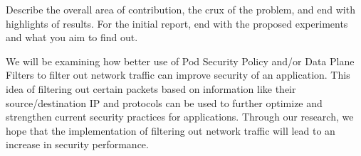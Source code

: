 Describe the overall area of contribution, the crux of the problem, 
and end with highlights of results. For the initial report, end with
the proposed experiments and what you aim to find out.

We will be examining how better use of Pod Security Policy and/or Data Plane Filters to filter out network traffic can improve security of an application.
This idea of filtering out certain packets based on information like their source/destination IP and protocols can be used to further optimize and strengthen current security practices
for applications. Through our research, we hope that the implementation of filtering out network traffic will lead to an increase in security performance. 